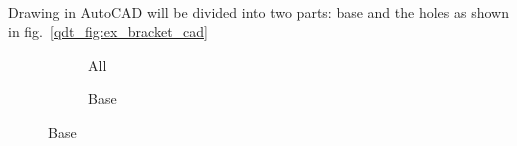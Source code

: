\paragraph{}
Drawing in AutoCAD will be divided into two parts: base and the holes as shown in fig.~\ref{qdt_fig:ex_bracket_cad}
    \begin{figure}[H]
        \centering
        \begin{subfigure}[b]{1\linewidth}
            \centering
            \caption{All}
        \end{subfigure}
        \begin{subfigure}[b]{0.4\linewidth}
            \caption{Base}

\end{subfigure}
\end{figure}
